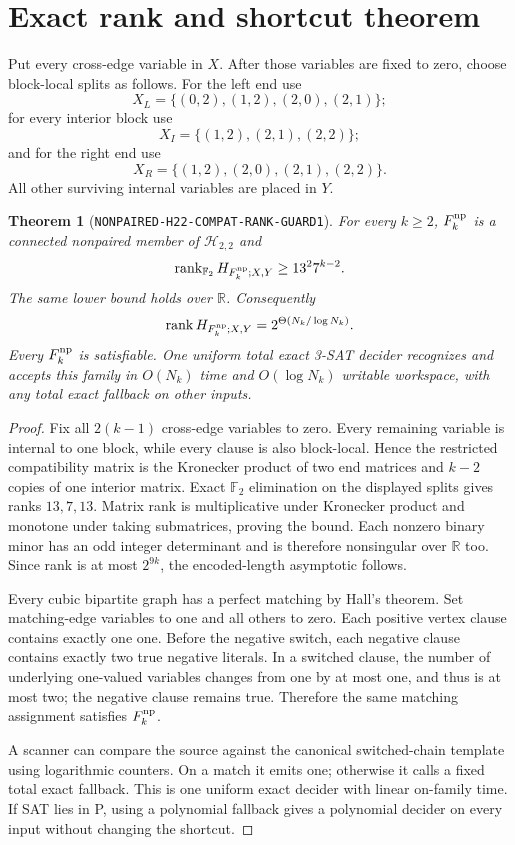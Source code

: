 \documentclass[11pt]{article}
\newtheorem{theorem}{Theorem}
\newcommand{\Htwo}{\mathcal H_{2,2}}
\begin{document}
\section{Exact rank and shortcut theorem}

Put every cross-edge variable in $X$.  After those variables are fixed to
zero, choose block-local splits as follows.  For the left end use
\[
 X_L=\{(0,2),(1,2),(2,0),(2,1)\};
\]
for every interior block use
\[
 X_I=\{(1,2),(2,1),(2,2)\};
\]
and for the right end use
\[
 X_R=\{(1,2),(2,0),(2,1),(2,2)\}.
\]
All other surviving internal variables are placed in $Y$.

\begin{theorem}[\texttt{NONPAIRED-H22-COMPAT-RANK-GUARD1}]
For every $k\ge2$, $F_k^{\rm np}$ is a connected nonpaired member of
$\Htwo$ and
\[
 \operatorname{rank}_{\mathbb F_2}H_{F_k^{\rm np};X,Y}
 \ge 13^2 7^{k-2}.
\]
The same lower bound holds over $\mathbb R$.  Consequently
\[
 \operatorname{rank}H_{F_k^{\rm np};X,Y}
 =2^{\Theta(N_k/\log N_k)}.
\]
Every $F_k^{\rm np}$ is satisfiable.  One uniform total exact 3-SAT decider
recognizes and accepts this family in $O(N_k)$ time and $O(\log N_k)$
writable workspace, with any total exact fallback on other inputs.
\end{theorem}

\begin{proof}
Fix all $2(k-1)$ cross-edge variables to zero.  Every remaining variable is
internal to one block, while every clause is also block-local.  Hence the
restricted compatibility matrix is the Kronecker product of two end matrices
and $k-2$ copies of one interior matrix.  Exact $\mathbb F_2$ elimination on
the displayed splits gives ranks $13,7,13$.  Matrix rank is multiplicative
under Kronecker product and monotone under taking submatrices, proving the
bound.  Each nonzero binary minor has an odd integer determinant and is
therefore nonsingular over $\mathbb R$ too.  Since rank is at most $2^{9k}$,
the encoded-length asymptotic follows.

Every cubic bipartite graph has a perfect matching by Hall's theorem.  Set
matching-edge variables to one and all others to zero.  Each positive vertex
clause contains exactly one one.  Before the negative switch, each negative
clause contains exactly two true negative literals.  In a switched clause,
the number of underlying one-valued variables changes from one by at most
one, and thus is at most two; the negative clause remains true.  Therefore
the same matching assignment satisfies $F_k^{\rm np}$.

A scanner can compare the source against the canonical switched-chain
template using logarithmic counters.  On a match it emits one; otherwise it
calls a fixed total exact fallback.  This is one uniform exact decider with
linear on-family time.  If SAT lies in P, using a polynomial fallback gives
a polynomial decider on every input without changing the shortcut.
\end{proof}
\end{document}
